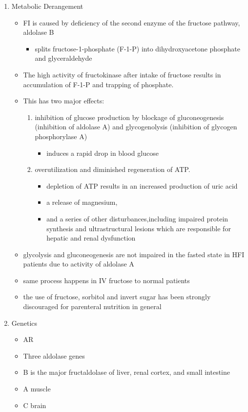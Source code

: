 \documentclass{scrartcl}
\begin{document}
\begin{enumerate}
\item Metabolic Derangement
\label{sec:org31da480}
\begin{itemize}
\item FI is caused by deficiency of the second enzyme of the fructose pathway, aldolase B
\begin{itemize}
\item splits fructose-1-phosphate (F-1-P) into dihydroxyacetone phosphate and glyceraldehyde
\end{itemize}
\item The high activity of fructokinase after intake of fructose results in accumulation of F-1-P and trapping of phosphate.
\item This has two major effects:
\begin{enumerate}
\item inhibition of glucose production by blockage of gluconeogenesis
(inhibition of aldolase A) and glycogenolysis (inhibition of glycogen phosphorylase A)
\begin{itemize}
\item induces a rapid drop in blood glucose
\end{itemize}
\item overutilization and diminished regeneration of ATP.
\begin{itemize}
\item depletion of ATP results in an increased production of uric acid
\item a release of magnesium,
\item and a series of other disturbances,including impaired protein
synthesis and ultrastructural lesions which are responsible for
hepatic and renal dysfunction
\end{itemize}
\end{enumerate}
\item glycolysis and gluconeogenesis are not impaired in the fasted state in HFI patients due to activity of aldolase A

\item same process happens in IV fructose to normal patients
\item the use of fructose, sorbitol and invert sugar has been strongly discouraged for parenteral nutrition in general
\end{itemize}

\item Genetics
\label{sec:org9835e1d}
\begin{itemize}
\item AR
\item Three aldolase genes
\item B is the major fructaldolase of liver, renal cortex, and small intestine
\item A muscle
\item C brain
\end{itemize}


\end{enumerate}
\end{document}
